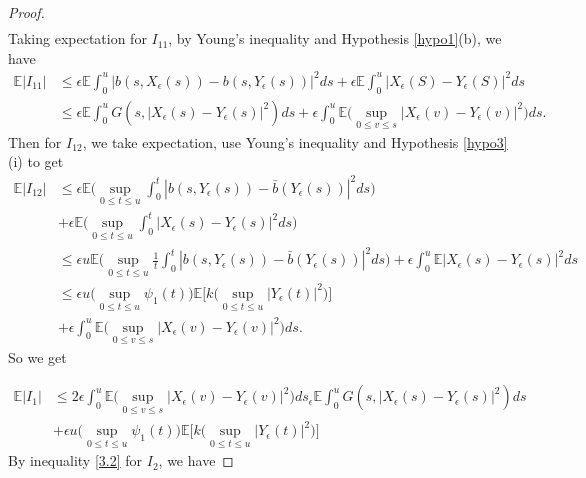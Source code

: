 \documentclass[a4 paper, 12pt]{report}
\theoremstyle{plain}
\begin{document}
\begin{proof}
\begin{align*}
\end{align*}
Taking expectation for $I_{11}$, by Young's inequality and Hypothesis \ref{hypo1}(b), we have 
\begin{align*}
\mathbb{E}|I_{11}|&\leq\epsilon\mathbb{E}\int_0^u|b(s,X_\epsilon(s)) - b(s,Y_\epsilon(s))|^2ds+\epsilon\mathbb{E}\int_0^u|X_\epsilon(S) - Y_\epsilon (S)|^2ds\\
&\leq \epsilon\mathbb{E}\int_0^u G(s,|X_\epsilon(s) - Y_\epsilon(s)|^2)ds+\epsilon\int_0^u\mathbb{E}\bigg(\sup_{0\leq v\leq s}|X_\epsilon(v) - Y_\epsilon(v)|^2\bigg)ds.
\end{align*}
Then for $I_{12}$, we take expectation, use Young’s inequality and Hypothesis \ref{hypo3}(i) to
get
\begin{align*}
\mathbb{E}|I_{12}|&\leq \epsilon\mathbb{E}\bigg(\sup_{0\leq t\leq u}\int_0^t|b(s,Y_\epsilon(s)) - \bar{b}(Y_\epsilon(s))|^2ds\bigg)\\
&+\epsilon\mathbb{E}\bigg(\sup_{0\leq t\leq u}\int_0^t|X_\epsilon(s) - Y_\epsilon(s)|^2ds\bigg)\\
&\leq \epsilon u\mathbb{E}\bigg(\sup_{0\leq t\leq u}\frac{1}{t}\int_0^t|b(s,Y_\epsilon(s)) - \bar{b}(Y_\epsilon(s))|^2ds\bigg)+\epsilon\int_0^u\mathbb{E}|X_\epsilon(s) - Y_\epsilon(s)|^2ds\\
&\leq \epsilon u\bigg(\sup_{0\leq t\leq u}\psi_1(t)\bigg)\mathbb{E}\bigg[k\bigg(\sup_{0\leq t\leq u}|Y_\epsilon(t)|^2\bigg)\bigg]\\
&+\epsilon\int_0^u\mathbb{E}\bigg(\sup_{0\leq v\leq s}|X_\epsilon(v) - Y_\epsilon(v)|^2\bigg)ds.
\end{align*}
So we get 


\begin{equation}\label{4.3}
\begin{split}
\mathbb{E}|I_1|&\leq 2\epsilon\int_0^u\mathbb{E}\bigg(\sup_{0\leq v\leq s}|X_\epsilon(v) - Y_\epsilon(v)|^2\bigg)ds _\epsilon\mathbb{E}\int_0^u G(s,|X_\epsilon(s) - Y_\epsilon(s)|^2)ds\\
&+\epsilon u\bigg(\sup_{0\leq t\leq u}\psi_1(t)\bigg)\mathbb{E}\bigg[k\bigg(\sup_{0\leq t\leq u}|Y_\epsilon(t)|^2\bigg)\bigg]
\end{split}
\end{equation}
By inequality \eqref{3.2} for $I_{2}$, we have


\end{proof}
\end{document}
